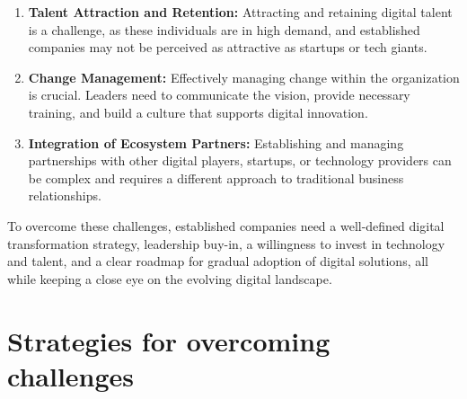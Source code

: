 \documentclass[a4]{scrartcl}
\begin{document}
\begin{enumerate}
		\item \textbf{Talent Attraction and Retention:} Attracting and retaining digital talent is a challenge, as these individuals are in high demand, and established companies may not be perceived as attractive as startups or tech giants.
		
		\item \textbf{Change Management:} Effectively managing change within the organization is crucial. Leaders need to communicate the vision, provide necessary training, and build a culture that supports digital innovation.
		
		\item \textbf{Integration of Ecosystem Partners:} Establishing and managing partnerships with other digital players, startups, or technology providers can be complex and requires a different approach to traditional business relationships.
	\end{enumerate}
	
	To overcome these challenges, established companies need a well-defined digital transformation strategy, leadership buy-in, a willingness to invest in technology and talent, and a clear roadmap for gradual adoption of digital solutions, all while keeping a close eye on the evolving digital landscape.
	










\newpage
\section{Strategies for overcoming challenges} \label{sec:Sec3}












	
\newpage
{}
\begin{spacing}{0.9}
	\printbibliography
\end{spacing}


	
	
	
	
	
	
\end{document}
